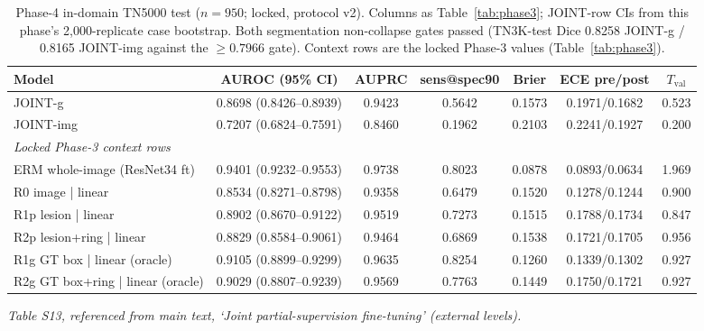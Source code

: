 \documentclass[11pt]{article}
\begin{document}
\begin{table}[!ht]
\centering\scriptsize
\setlength{\tabcolsep}{3pt}
\caption{Phase-4 in-domain TN5000 test ($n{=}950$; locked, protocol v2).
Columns as Table~\ref{tab:phase3}; JOINT-row CIs from this phase's
2,000-replicate case bootstrap. Both segmentation non-collapse gates passed
(TN3K-test Dice 0.8258 JOINT-g / 0.8165 JOINT-img against the
$\geq 0.7966$ gate). Context rows are the locked Phase-3 values
(Table~\ref{tab:phase3}).}
\label{tab:phase4_indomain}
\begin{tabular}{lcccccc}
\toprule
Model & AUROC (95\% CI) & AUPRC & sens@spec90 & Brier & ECE pre/post & $T_{\mathrm{val}}$ \\
\midrule
JOINT-g   & 0.8698 (0.8426--0.8939) & 0.9423 & 0.5642 & 0.1573 & 0.1971/0.1682 & 0.523 \\
JOINT-img & 0.7207 (0.6824--0.7591) & 0.8460 & 0.1962 & 0.2103 & 0.2241/0.1927 & 0.200 \\
\midrule
\multicolumn{7}{l}{\emph{Locked Phase-3 context rows}}\\
ERM whole-image (ResNet34 ft) & 0.9401 (0.9232--0.9553) & 0.9738 & 0.8023 & 0.0878 & 0.0893/0.0634 & 1.969 \\
R0 image | linear             & 0.8534 (0.8271--0.8798) & 0.9358 & 0.6479 & 0.1520 & 0.1278/0.1244 & 0.900 \\
R1p lesion | linear           & 0.8902 (0.8670--0.9122) & 0.9519 & 0.7273 & 0.1515 & 0.1788/0.1734 & 0.847 \\
R2p lesion+ring | linear      & 0.8829 (0.8584--0.9061) & 0.9464 & 0.6869 & 0.1538 & 0.1721/0.1705 & 0.956 \\
R1g GT box | linear (oracle)  & 0.9105 (0.8899--0.9299) & 0.9635 & 0.8254 & 0.1260 & 0.1339/0.1302 & 0.927 \\
R2g GT box+ring | linear (oracle) & 0.9029 (0.8807--0.9239) & 0.9569 & 0.7763 & 0.1449 & 0.1750/0.1721 & 0.927 \\
\bottomrule
\end{tabular}
\end{table}

\noindent\emph{Table S13, referenced from main text, `Joint partial-supervision fine-tuning' (external levels).}
\end{document}
